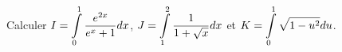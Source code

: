 \documentclass[a4paper, 11pt]{article}
\begin{document}
{{{{\begin{dboxminipage}{12cm}
\end{dboxminipage}




{\footnotesize \begin{exo}
	Calculer $\displaystyle I=\int\limits_0^1 \displaystyle\frac{e^{2x}}{e^x+1} dx$,  $\displaystyle J=\int\limits_1^2 \displaystyle\frac{1}{1+\sqrt{x}} dx$ et $\displaystyle K=\int\limits_0^1 \sqrt{1-u^2} du$.
\end{exo}}


%
%
%
%  
%
%
% 
%
}}}}
\end{document}
